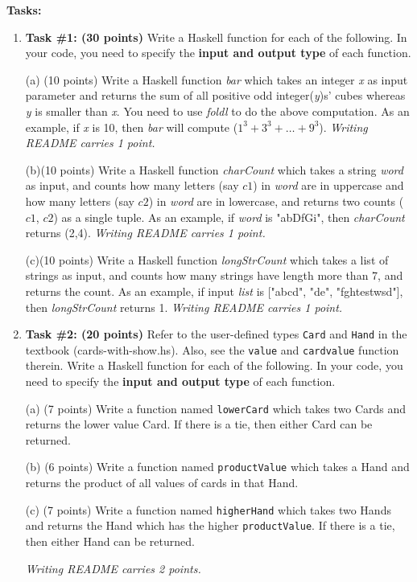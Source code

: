\documentclass[paper=letter, fontsize=11pt]{scrartcl} %
\begin{document}
    \textbf{Tasks:}
    \begin{enumerate}

        \item \textbf{Task \#1: (30 points)} Write a Haskell function for each of the following. In your code, you need to specify the \textbf{input and output type} of each function. 

(a) (10 points) Write a Haskell function \emph{bar} which takes an integer \emph{x} as input parameter 
and returns the sum of all positive odd integer(\emph{y})s' cubes whereas \emph{y} is smaller than \emph{x}. 
You need to use \emph{foldl} to do the above computation. 
As an example, if \emph{x} is 10, then \emph{bar} will compute (${1^3} + {3^3} + \ldots + {9^3}$).
\emph{Writing README carries 1 point.}


(b)(10 points) Write a Haskell function \emph{charCount} which takes a string \emph{word} as input, 
and counts how many letters (say $c1$) in \emph{word} are in uppercase and how many letters 
(say $c2$) in \emph{word} are in lowercase, and returns two counts ($c1$, $c2$) as a single tuple. 
As an example, if \emph{word} is "abDfGi", then \emph{charCount} returns (2,4). 
\emph{Writing README carries 1 point.}

(c)(10 points) Write a Haskell function \emph{longStrCount} which takes a list of strings as input, and 
counts how many strings have length more than 7, and returns the count. 
As an example, if input \emph{list} is ["abcd", "de", "fghtestwsd"], then \emph{longStrCount} returns 1. 
\emph{Writing README carries 1 point.}
 
       \item \textbf{Task \#2: (20 points)} Refer to the user-defined types \texttt{Card} and \texttt{Hand} in the textbook (cards-with-show.hs).
Also, see the \texttt{value} and \texttt{cardvalue} function therein. Write a Haskell function for each of the following. 
In your code, you need to specify the \textbf{input and output type} of each function. 

(a) (7 points) Write a function named \texttt{lowerCard} which takes two Cards and 
returns the lower value Card. If there is a tie, then either Card can be returned.

(b) (6 points) Write a function named \texttt{productValue} which takes a Hand and 
returns the product of all values of cards in that Hand.

(c) (7 points) Write a function named \texttt{higherHand} which takes two Hands and 
returns the Hand which has the higher \texttt{productValue}. If there is a tie, then either Hand can be returned.

\emph{Writing README carries 2 points.}

    
    \end{enumerate}
\end{document}
